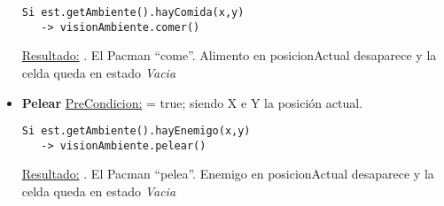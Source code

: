 \begin{itemize}
\begin{verbatim}
Si est.getAmbiente().hayComida(x,y)
   -> visionAmbiente.comer()
\end{verbatim}

\underline{Resultado:} . El Pacman ``come''.
Alimento en posicionActual desaparece y la celda queda en estado \textit{Vacia}


\item \textbf{Pelear}\newline
\underline{PreCondicion:}  = true;
siendo X e Y la posición actual.

\begin{verbatim}
Si est.getAmbiente().hayEnemigo(x,y)
   -> visionAmbiente.pelear()
\end{verbatim}

\underline{Resultado:} . El Pacman ``pelea''.
Enemigo en posicionActual desaparece y la celda queda en estado \textit{Vacia}

\end{itemize}
